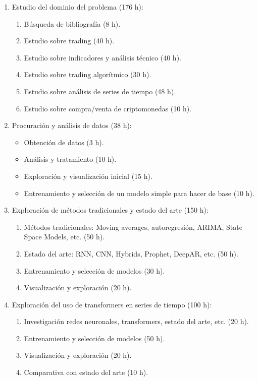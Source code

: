 \documentclass[
    11pt, %
]{charter}
\begin{document}
    \begin{enumerate}
    \item Estudio del dominio del problema (176 h):
      \begin{enumerate}
      \item Búsqueda de bibliografía (8 h).
      \item Estudio sobre trading (40 h).
      \item Estudio sobre indicadores y análisis técnico (40 h).
      \item Estudio sobre trading algorítmico (30 h).
      \item Estudio sobre análisis de series de tiempo (48 h).
      \item Estudio sobre compra/venta de criptomonedas (10 h).
      \end{enumerate}

    \item Procuración y análisis de datos (38 h):
      \begin{itemize}
      \item Obtención de datos (3 h).
      \item Análisis y tratamiento (10 h).
      \item Exploración y visualización inicial (15 h).
      \item Entrenamiento y selección de un modelo simple para hacer de base (10 h).
      \end{itemize}

    \item Exploración de métodos tradicionales y estado del arte (150 h):
      \begin{enumerate}
      \item Métodos tradicionales: Moving averages, autoregresión, ARIMA, State Space Models, etc. (50 h).
      \item Estado del arte: RNN, CNN, Hybrids, Prophet, DeepAR, etc. (50 h).
      \item Entrenamiento y selección de modelos (30 h).
      \item Visualización y exploración (20 h).
      \end{enumerate}

    \item Exploración del uso de transformers en series de tiempo (100 h):
      \begin{enumerate}
      \item Investigación redes neuronales, transformers, estado del arte, etc. (20 h).
      \item Entrenamiento y selección de modelos (50 h).
      \item Visualización y exploración (20 h).
      \item Comparativa con estado del arte (10 h).
      \end{enumerate}


\end{enumerate}
\end{document}
